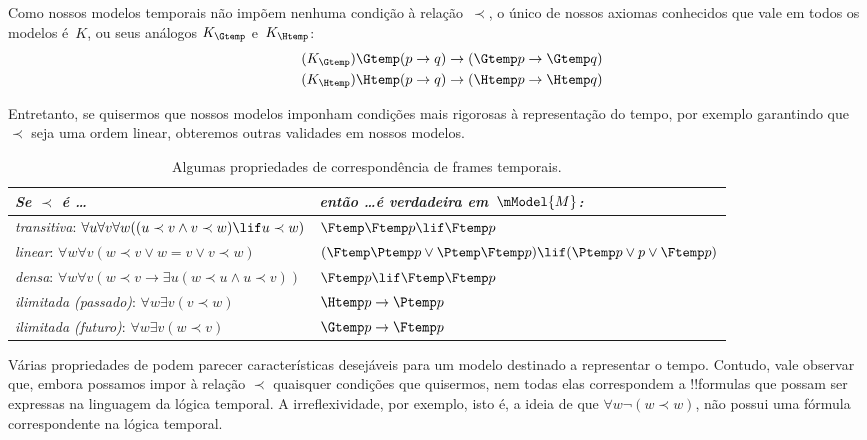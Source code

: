 \documentclass[../../../include/open-logic-section]{subfiles}
\begin{document}


Como nossos modelos temporais não impõem nenhuma condição à
relação~$\prec$, o único de nossos axiomas conhecidos que vale em
todos os modelos é~$K$, ou seus análogos $K_{\Gtemp}$ e~$K_{\Htemp}$:
\begin{align*}
\tag{$K_{\Gtemp}$}  \Gtemp (p \to q) & \to (\Gtemp p \to \Gtemp q)\\
\tag{$K_{\Htemp}$}  \Htemp (p \to q) & \to (\Htemp p \to \Htemp q)
\end{align*}

Entretanto, se quisermos que nossos modelos imponham condições mais
rigorosas à representação do tempo, por exemplo garantindo que $\prec$
seja uma ordem linear, obteremos outras validades em nossos modelos.

\begin{table}[t]
  \begin{tabular}{| p{} || p{} |}
    \hline
    {\emph{Se $\prec$ é \dots}} & {\emph{então \dots é verdadeira em~$\mModel{M}$:}} \\
    \hline \hline
    \emph{transitiva}: \newline
    $\forall u \forall v \forall w ((u \prec v \land v \prec w) \lif u \prec w)$ & 
    $\Ftemp \Ftemp p \lif \Ftemp p$  \\
    \hline 
    \emph{linear}: \newline
    $\forall w \forall v (w \prec v \lor w = v \lor v \prec w)$ &  
    $(\Ftemp \Ptemp  p \lor \Ptemp \Ftemp p) \lif (\Ptemp p \lor p \lor \Ftemp p)$\\
    \hline
    \emph{densa}: \newline
    $\forall w \forall v (w \prec v \to \exists u(w \prec u \land u \prec v))$ &  
    $\Ftemp p \lif \Ftemp \Ftemp p$ \\
    \hline
    \emph{ilimitada (passado)}: \newline
    $\forall w \exists v( v \prec w)$ &  
    $\Htemp p \to \Ptemp p$ \\
    \hline
    \emph{ilimitada (futuro)}: \newline
    $\forall w \exists v( w \prec v)$ &  
    $\Gtemp p \to \Ftemp p$ \\
    \hline
  \end{tabular}
  \caption{Algumas propriedades de correspondência de frames temporais.}
\end{table} 

Várias propriedades de  podem parecer
características desejáveis para um modelo destinado a representar o
tempo. Contudo, vale observar que, embora possamos impor à relação
$\prec$ quaisquer condições que quisermos, nem todas elas correspondem
a !!{formula}s que possam ser expressas na linguagem da lógica
temporal. A irreflexividade, por exemplo, isto é, a ideia de que
$\forall w \lnot (w \prec w)$, não possui uma fórmula correspondente
na lógica temporal. 
\end{document}
